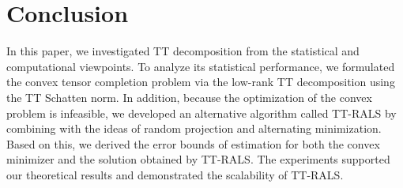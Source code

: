 \section{Conclusion}

In this paper, we investigated TT decomposition from the statistical
and computational viewpoints. To analyze its statistical performance,
we formulated the convex tensor completion problem via the low-rank TT
decomposition using the TT Schatten norm. In addition, because the
optimization of the convex problem is infeasible, we developed an
alternative algorithm called TT-RALS by combining with the ideas of
random projection and alternating minimization. Based on this, we
derived the error bounds of estimation for both the convex minimizer
and the solution obtained by TT-RALS. The experiments supported our
theoretical results and demonstrated the scalability of TT-RALS.

